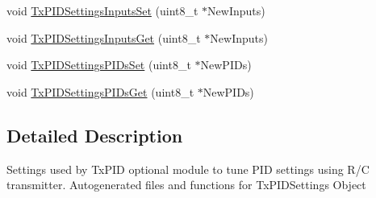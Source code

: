 \begin{DoxyCompactItemize}
\item 
void \hyperlink{group___tx_p_i_d_settings_gaab328c7a232be9a59d2c001fbee45556}{\-Tx\-P\-I\-D\-Settings\-Inputs\-Set} (uint8\-\_\-t $\ast$\-New\-Inputs)
\item 
void \hyperlink{group___tx_p_i_d_settings_ga58a5662baa2f7828f8875c0514f3fa46}{\-Tx\-P\-I\-D\-Settings\-Inputs\-Get} (uint8\-\_\-t $\ast$\-New\-Inputs)
\item 
void \hyperlink{group___tx_p_i_d_settings_ga4643b7bb5b685b13c657ef1f4bd22555}{\-Tx\-P\-I\-D\-Settings\-P\-I\-Ds\-Set} (uint8\-\_\-t $\ast$\-New\-P\-I\-Ds)
\item 
void \hyperlink{group___tx_p_i_d_settings_gadada407c1282aefd3eb6cef9d701b5d9}{\-Tx\-P\-I\-D\-Settings\-P\-I\-Ds\-Get} (uint8\-\_\-t $\ast$\-New\-P\-I\-Ds)
\end{DoxyCompactItemize}


\subsection{\-Detailed \-Description}
\-Settings used by \-Tx\-P\-I\-D optional module to tune \-P\-I\-D settings using \-R/\-C transmitter. \-Autogenerated files and functions for \-Tx\-P\-I\-D\-Settings \-Object 

